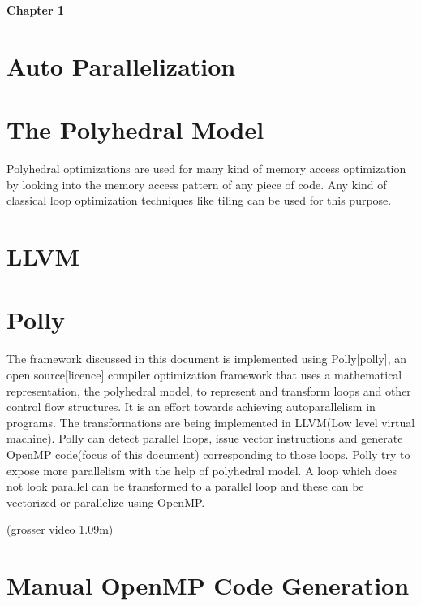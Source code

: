 \documentclass[a4paper,12pt]{article}
\begin{document}
\begin{center}
{\bf {\LARGE Chapter 1}\linebreak{}}
\linebreak
\linebreak
\end{center}

\section{Auto Parallelization}
\section{The Polyhedral Model}

Polyhedral optimizations are used for many kind of memory access optimization by
looking into the memory access pattern of any piece of code. Any kind of classical
 loop optimization techniques like tiling can be used for this purpose. 


\section{LLVM}
\section{Polly}
The framework discussed in this document is implemented using Polly[polly],
an open source[licence] compiler  optimization framework that uses a mathematical
 representation, the polyhedral model, to represent and transform loops and other
 control flow structures. It is an effort towards achieving autoparallelism in programs.
 The transformations are being implemented in LLVM(Low level virtual machine). 
Polly can detect parallel loops, issue vector instructions and generate OpenMP code(focus of 
this document) corresponding to those loops. Polly try to expose more parallelism
with the help of polyhedral model. A loop which does not look parallel can be transformed
to a parallel loop and these can be vectorized or parallelize using OpenMP.

(grosser video 1.09m)

\section{Manual OpenMP Code Generation}
\end{document}
